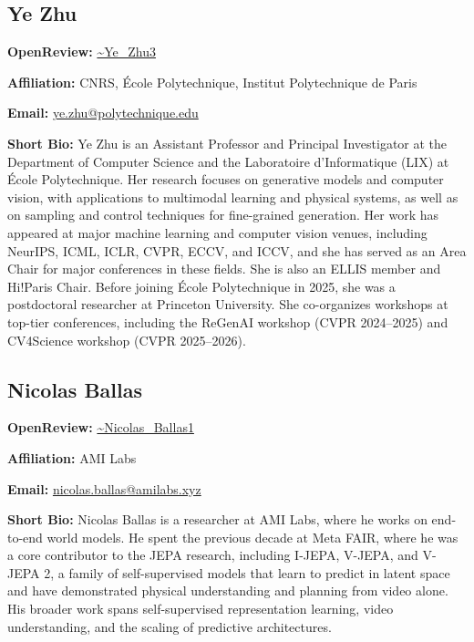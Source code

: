 \documentclass[11pt]{article}
\begin{document}
\subsection{Ye Zhu}

\textbf{OpenReview:} \href{https://openreview.net/profile?id=\string~Ye\_Zhu3}{\textasciitilde{}Ye\_Zhu3}


\textbf{Affiliation:} CNRS, École Polytechnique, Institut Polytechnique de Paris


\textbf{Email:} \href{mailto:ye.zhu@polytechnique.edu}{ye.zhu@polytechnique.edu}


\textbf{Short Bio:} Ye Zhu is an Assistant Professor and Principal Investigator at the Department of Computer Science and the Laboratoire d'Informatique (LIX) at École Polytechnique. Her research focuses on generative models and computer vision, with applications to multimodal learning and physical systems, as well as on sampling and control techniques for fine-grained generation. Her work has appeared at major machine learning and computer vision venues, including NeurIPS, ICML, ICLR, CVPR, ECCV, and ICCV, and she has served as an Area Chair for major conferences in these fields. She is also an ELLIS member and Hi!Paris Chair. Before joining École Polytechnique in 2025, she was a postdoctoral researcher at Princeton University. She co-organizes workshops at top-tier conferences, including the ReGenAI workshop (CVPR 2024--2025) and CV4Science workshop (CVPR 2025--2026).


\subsection{Nicolas Ballas}

\textbf{OpenReview:} \href{https://openreview.net/profile?id=\string~Nicolas\_Ballas1}{\textasciitilde{}Nicolas\_Ballas1}


\textbf{Affiliation:} AMI Labs


\textbf{Email:} \href{mailto:nicolas.ballas@amilabs.xyz}{nicolas.ballas@amilabs.xyz}


\textbf{Short Bio:} Nicolas Ballas is a researcher at AMI Labs, where he works on end-to-end world models. He spent the previous decade at Meta FAIR, where he was a core contributor to the JEPA research, including I-JEPA, V-JEPA, and V-JEPA 2, a family of self-supervised models that learn to predict in latent space and have demonstrated physical understanding and planning from video alone. His broader work spans self-supervised representation learning, video understanding, and the scaling of predictive architectures.
\end{document}
